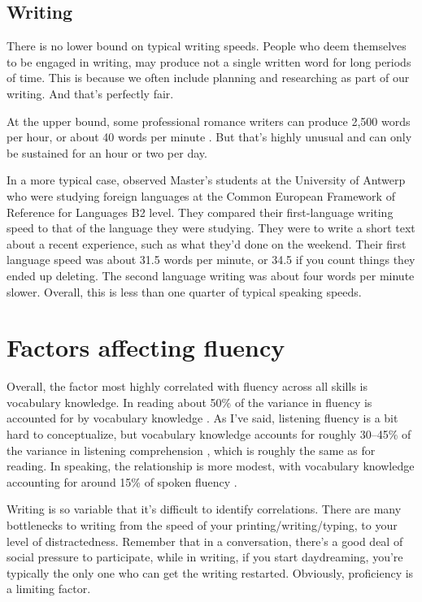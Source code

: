 \subsection{Writing}

There is no lower bound on typical writing speeds. People who deem themselves to be engaged in writing, may produce not a single written word for long periods of time. This is because we often include planning and researching as part of our writing. And that's perfectly fair.

At the upper bound, some professional romance writers can produce 2,500 words per hour, or about 40 words per minute \citep{Ha2017}. But that's highly unusual and can only be sustained for an hour or two per day.

In a more typical case, \citet{VanWaes2015} observed Master's students at the University of Antwerp who were studying foreign languages at the Common European Framework of Reference for Languages B2 level. They compared their first-language writing speed to that of the language they were studying. They were to write a short text about a recent experience, such as what they'd done on the weekend. Their first language speed was about 31.5 words per minute, or 34.5 if you count things they ended up deleting. The second language writing was about four words per minute slower. Overall, this is less than one quarter of typical speaking speeds.

\section{Factors affecting fluency}

Overall, the factor most highly correlated with fluency across all skills is vocabulary knowledge.  In reading about 50\% of the variance in fluency is accounted for by vocabulary knowledge \citep{Grabe2010}. As I've said, listening fluency is a bit hard to conceptualize, but vocabulary knowledge accounts for roughly 30--45\% of the variance in listening comprehension \citep{Zhang2022a}, which is roughly the same as for reading. In speaking, the relationship is more modest, with vocabulary knowledge accounting for around 15\% of spoken fluency \citep{Uchihara2019a,Liu2020}.

Writing is so variable that it's difficult to identify correlations. There are many bottlenecks to writing from the speed of your printing/writing/typing, to your level of distractedness. Remember that in a conversation, there's a good deal of social pressure to participate, while in writing, if you start daydreaming, you're typically the only one who can get the writing restarted. Obviously, proficiency is a limiting factor.

